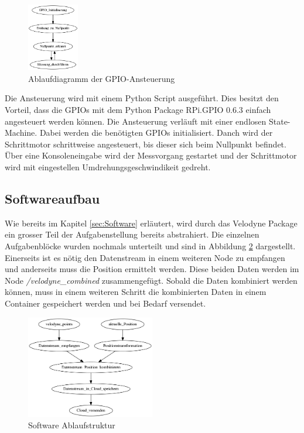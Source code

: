 \begin{figure}[H]
	\centering
	\includegraphics[width=0.2\textwidth]{resources/GPIO_Ansteuerung.png}
	\caption{Ablaufdiagramm der GPIO-Ansteuerung}
	\label{fig:state_machine}
\end{figure} 

Die Ansteuerung wird mit einem Python Script ausgeführt. Dies besitzt den Vorteil, dass die GPIOs mit dem Python Package RPi.GPIO 0.6.3 einfach angesteuert werden können. Die Ansteuerung verläuft mit einer endlosen \ac{State-Machine}. Dabei werden die benötigten GPIOs initialisiert. Danch wird der Schrittmotor schrittweise angesteuert, bis dieser sich beim Nullpunkt befindet. Über eine Konsoleneingabe wird der Messvorgang gestartet und der Schrittmotor wird mit eingestellen Umdrehungsgeschwindikeit gedreht.
 
\subsection{Softwareaufbau}
\label{subsec:Softwareaufbau}
Wie bereits im Kapitel \ref{sec:Software} erläutert, wird durch das Velodyne Package ein grosser Teil der Aufgabenstellung bereits abstrahiert. Die einzelnen Aufgabenblöcke wurden nochmals unterteilt und sind in Abbildung \ref{fig:software_flow} dargestellt. Einerseits ist es nötig den Datenstream in einem weiteren Node zu empfangen und anderseits muss die Position ermittelt werden. Diese beiden Daten werden im Node \textit{/velodyne\_combined} zusammengefügt. Sobald die Daten kombiniert werden können, muss in einem weiteren Schritt die kombinierten Daten in einem Container gespeichert werden und bei Bedarf versendet.

\begin{figure}[H]
	\centering
	\includegraphics[width=0.5\textwidth]{resources/software_flow.png}
	\caption{Software Ablaufstruktur}
	\label{fig:software_flow}
\end{figure}  

